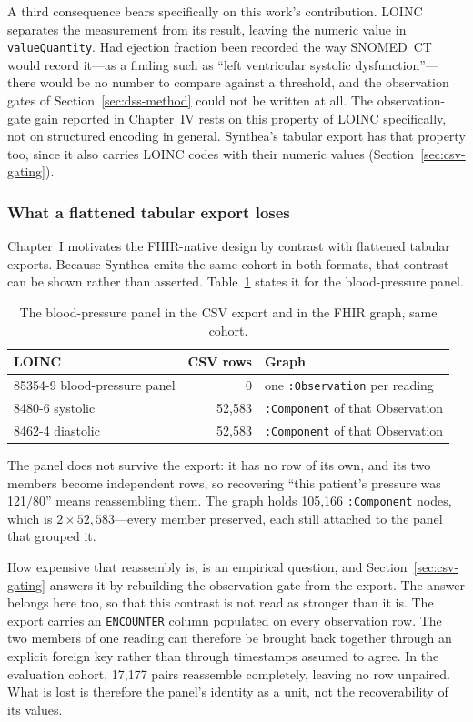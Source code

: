 A third consequence bears specifically on this work's contribution. LOINC separates the
measurement from its result, leaving the numeric value in \texttt{valueQuantity}. Had ejection
fraction been recorded the way SNOMED~CT would record it---as a finding such as ``left
ventricular systolic dysfunction''---there would be no number to compare against a threshold,
and the observation gates of Section~\ref{sec:dss-method} could not be written at all. The
observation-gate gain reported in Chapter~IV rests on this property of LOINC specifically, not
on structured encoding in general. Synthea's tabular export has that property too, since it
also carries LOINC codes with their numeric values (Section~\ref{sec:csv-gating}).

\subsubsection*{What a flattened tabular export loses}
\label{sec:flattening}
Chapter~I motivates the FHIR-native design by contrast with flattened tabular exports. Because
Synthea emits the same cohort in both formats, that contrast can be shown rather than asserted.
Table~\ref{tab:flattening} states it for the blood-pressure panel.

\begin{table}[h]
\centering
\caption{The blood-pressure panel in the CSV export and in the FHIR graph, same cohort.}
\label{tab:flattening}
\begin{tabular}{lrl}
\hline
\textbf{LOINC} & \textbf{CSV rows} & \textbf{Graph} \\
\hline
85354-9 blood-pressure panel & 0        & one \texttt{:Observation} per reading \\
8480-6 systolic              & 52{,}583 & \texttt{:Component} of that Observation \\
8462-4 diastolic             & 52{,}583 & \texttt{:Component} of that Observation \\
\hline
\end{tabular}
\end{table}

The panel does not survive the export: it has no row of its own, and its two members become
independent rows, so recovering ``this patient's pressure was 121/80'' means reassembling them.
The graph holds 105{,}166 \texttt{:Component} nodes, which is $2 \times 52{,}583$---every member
preserved, each still attached to the panel that grouped it.

How expensive that reassembly is, is an empirical question, and Section~\ref{sec:csv-gating}
answers it by rebuilding the observation gate from the export. The answer belongs here too, so that this contrast is not read as stronger than it is. The
export carries an \texttt{ENCOUNTER} column populated on every observation row. The two
members of one reading can therefore be brought back together through an explicit foreign
key rather than through timestamps assumed to agree. In the
evaluation cohort, 17{,}177 pairs reassemble completely, leaving no row unpaired. What is lost is
therefore the panel's identity as a unit, not the recoverability of its values.

